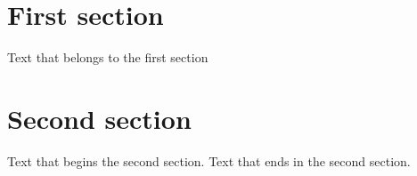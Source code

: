 



\section{First section} %
Text that belongs to the first section

\section{Second section} %
Text that begins the second section.
Text that ends in the second section.

